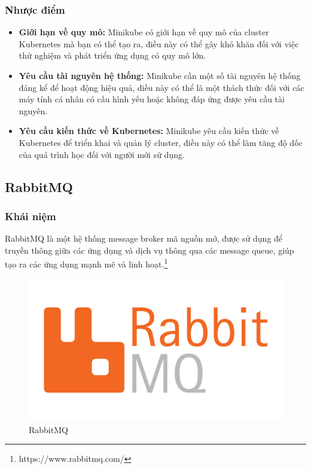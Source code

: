 \subsubsection{Nhược điểm}
\begin{itemize}
  \item \textbf{Giới hạn về quy mô:} Minikube có giới hạn về quy mô của cluster Kubernetes mà bạn có thể tạo ra, điều này có thể gây khó khăn đối với việc thử nghiệm và phát triển ứng dụng có quy mô lớn.
  \item \textbf{Yêu cầu tài nguyên hệ thống:} Minikube cần một số tài nguyên hệ thống đáng kể để hoạt động hiệu quả, điều này có thể là một thách thức đối với các máy tính cá nhân có cấu hình yếu hoặc không đáp ứng được yêu cầu tài nguyên.
  \item \textbf{Yêu cầu kiến thức về Kubernetes:} Minikube yêu cầu kiến thức về Kubernetes để triển khai và quản lý cluster, điều này có thể làm tăng độ dốc của quá trình học đối với người mới sử dụng.
\end{itemize}
\subsection{RabbitMQ}
\subsubsection{Khái niệm}
\noindent RabbitMQ là một hệ thống message broker mã nguồn mở, được sử dụng để truyền thông giữa các ứng dụng và dịch vụ thông qua các message queue, giúp tạo ra các ứng dụng mạnh mẽ và linh hoạt.\footnote{https://www.rabbitmq.com/}
\begin{figure}[H]
  \begin{center}
    \includegraphics[scale=0.3]{images/hieu/phuluc/rabbitmq.png}
    \caption{RabbitMQ}
  \end{center}
\end{figure}

